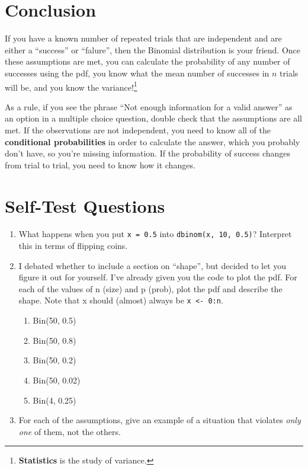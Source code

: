 \documentclass[
  letterpaper,
  DIV=11,
  numbers=noendperiod]{scrreprt}
\providecommand{\tightlist}{%
  \setlength{\itemsep}{0pt}\setlength{\parskip}{0pt}}\usepackage{longtable,booktabs,array}
\begin{document}
\hypertarget{conclusion}{%
\section{Conclusion}\label{conclusion}}

If you have a known number of repeated trials that are independent and
are either a ``success'' or ``falure'', then the Binomial distribution
is your friend. Once these assumptions are met, you can calculate the
probability of any number of successes using the pdf, you know what the
mean number of successes in \(n\) trials will be, and you know the
variance!\footnote{\textbf{Statistics} is the study of variance.}

As a rule, if you see the phrase ``Not enough information for a valid
answer'' as an option in a multiple choice question, double check that
the assumptions are all met. If the observations are not independent,
you need to know all of the \textbf{conditional probabilities} in order
to calculate the answer, which you probably don't have, so you're
missing information. If the probability of success changes from trial to
trial, you need to know how it changes.

\hypertarget{self-test-questions}{%
\section{Self-Test Questions}\label{self-test-questions}}

\begin{enumerate}
\def\labelenumi{\arabic{enumi}.}
\tightlist
\item
  What happens when you put \texttt{x\ =\ 0.5} into
  \texttt{dbinom(x,\ 10,\ 0.5)}? Interpret this in terms of flipping
  coins.
\item
  I debated whether to include a section on ``shape'', but decided to
  let you figure it out for yourself. I've already given you the code to
  plot the pdf. For each of the values of n (size) and p (prob), plot
  the pdf and describe the shape. Note that x should (almost) always be
  \texttt{x\ \textless{}-\ 0:n}.

  \begin{enumerate}
  \def\labelenumii{\alph{enumii})}
  \tightlist
  \item
    Bin(50, 0.5)
  \item
    Bin(50, 0.8)
  \item
    Bin(50, 0.2)
  \item
    Bin(50, 0.02)
  \item
    Bin(4, 0.25)
  \end{enumerate}
\item
  For each of the assumptions, give an example of a situation that
  violates \emph{only one} of them, not the others.
\end{enumerate}
\end{document}
